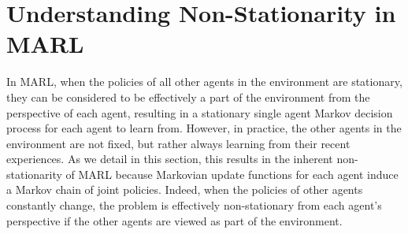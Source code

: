 \section{Understanding Non-Stationarity in MARL}\label{sec:background-non-stationarity}
In MARL, when the policies of all other agents in the environment are stationary, they can be considered to be effectively a part of the environment from the perspective of each agent, resulting in a stationary single agent Markov decision process for each agent to learn from. 
However, in practice, the other agents in the environment are not fixed, but rather always learning from their recent experiences. As we detail in this section, this results in the inherent non-stationarity of MARL because Markovian update functions for each agent induce a Markov chain of joint policies. Indeed, when the policies of other agents constantly change, the problem is effectively non-stationary from each agent's perspective if the other agents are viewed as part of the environment.  

